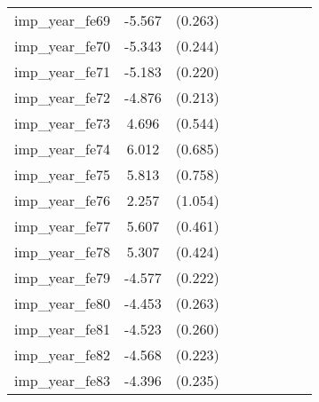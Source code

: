 {\begin{tabular}{l*{4}{cc}}
imp\_year\_fe69&   -5.567\sym{***}&  (0.263)&                  &         &                  &         &                  &         \\
imp\_year\_fe70&   -5.343\sym{***}&  (0.244)&                  &         &                  &         &                  &         \\
imp\_year\_fe71&   -5.183\sym{***}&  (0.220)&                  &         &                  &         &                  &         \\
imp\_year\_fe72&   -4.876\sym{***}&  (0.213)&                  &         &                  &         &                  &         \\
imp\_year\_fe73&    4.696\sym{***}&  (0.544)&                  &         &                  &         &                  &         \\
imp\_year\_fe74&    6.012\sym{***}&  (0.685)&                  &         &                  &         &                  &         \\
imp\_year\_fe75&    5.813\sym{***}&  (0.758)&                  &         &                  &         &                  &         \\
imp\_year\_fe76&    2.257\sym{*}  &  (1.054)&                  &         &                  &         &                  &         \\
imp\_year\_fe77&    5.607\sym{***}&  (0.461)&                  &         &                  &         &                  &         \\
imp\_year\_fe78&    5.307\sym{***}&  (0.424)&                  &         &                  &         &                  &         \\
imp\_year\_fe79&   -4.577\sym{***}&  (0.222)&                  &         &                  &         &                  &         \\
imp\_year\_fe80&   -4.453\sym{***}&  (0.263)&                  &         &                  &         &                  &         \\
imp\_year\_fe81&   -4.523\sym{***}&  (0.260)&                  &         &                  &         &                  &         \\
imp\_year\_fe82&   -4.568\sym{***}&  (0.223)&                  &         &                  &         &                  &         \\
imp\_year\_fe83&   -4.396\sym{***}&  (0.235)&                  &         &                  &         &                  &         \\

\end{tabular}}
